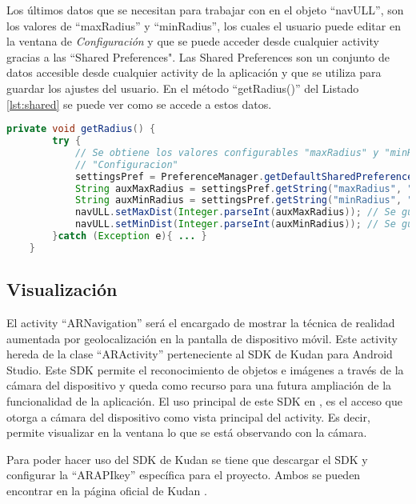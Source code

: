 Los últimos datos que se necesitan para trabajar con en el objeto ``navULL'', son los valores de ``maxRadius'' y ``minRadius'', los cuales el usuario puede editar en la ventana de \textit{Configuración} y que se puede acceder desde cualquier activity gracias a las ``Shared Preferences". Las Shared Preferences son un conjunto de datos accesible desde cualquier activity de la aplicación y que se utiliza para guardar los ajustes del usuario. En el método ``getRadius()'' del Listado \ref{lst:shared} se puede ver como se accede a estos datos.

\begin{lstlisting}[language=java, caption={Fichero \texttt{ARNavigation.java}, código que se encarga de guardar los valores de ``maxDist'' y ``minDist'' del objeto ``navULL''},  label={lst:shared}]
    private void getRadius() {
        try {
            // Se obtiene los valores configurables "maxRadius" y "minRadius" en la ventana de 
            // "Configuracion"
            settingsPref = PreferenceManager.getDefaultSharedPreferences(getContext());
            String auxMaxRadius = settingsPref.getString("maxRadius", "null");
            String auxMinRadius = settingsPref.getString("minRadius", "null");
            navULL.setMaxDist(Integer.parseInt(auxMaxRadius)); // Se guarda el valor "maxRadius"
            navULL.setMinDist(Integer.parseInt(auxMinRadius)); // Se guarda el valor "minRadius"
        }catch (Exception e){ ... }
    }
\end{lstlisting}

\subsection{Visualización}

El activity ``ARNavigation'' será el encargado de mostrar la técnica de realidad aumentada por geolocalización en la pantalla de dispositivo móvil. Este activity hereda de la clase ``ARActivity'' perteneciente al  SDK de Kudan para Android Studio. Este SDK permite el reconocimiento de objetos e imágenes a través de la cámara del dispositivo y queda como recurso para una futura ampliación de la funcionalidad de la aplicación. El uso principal de este SDK en \ULLAR{}, es el acceso que otorga a cámara del dispositivo como vista principal del activity. Es decir, permite visualizar en la ventana lo que se está observando con la cámara.

Para poder hacer uso del SDK de Kudan se tiene que descargar el SDK y configurar la ``ARAPIkey'' específica para el proyecto. Ambos se pueden encontrar en la página oficial de Kudan \cite{URL::kudan}. 

